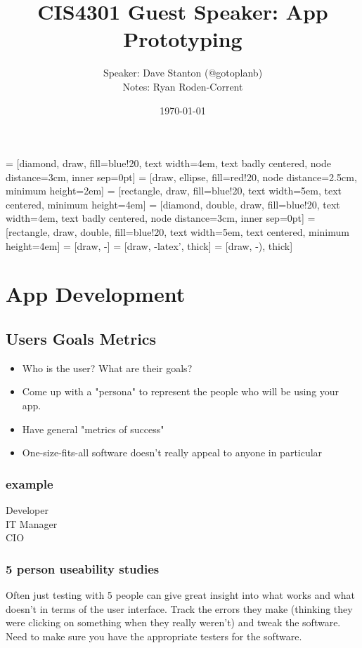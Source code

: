 \documentclass[12pt]{article}
\title{CIS4301 Guest Speaker: App Prototyping}
\author{
  Speaker: Dave Stanton (@gotoplanb)\\
  Notes: Ryan Roden-Corrent
}
\date{\today}
\begin{document}
\setlength\parindent{0pt}
 = [diamond, draw, fill=blue!20, text width=4em,
  text badly centered, node distance=3cm, inner sep=0pt]
 = [draw, ellipse, fill=red!20, node distance=2.5cm,
  minimum height=2em]
 = [rectangle, draw, fill=blue!20, text width=5em,
  text centered, minimum height=4em]
 = [diamond, double, draw, fill=blue!20, text width=4em,
  text badly centered, node distance=3cm, inner sep=0pt]
 = [rectangle, draw, double, fill=blue!20, text width=5em,
  text centered, minimum height=4em]
 = [draw, -]
 = [draw, -latex', thick]
 = [draw, -), thick]
\maketitle

\section{App Development}
\subsection{Users Goals Metrics}
\begin{itemize}
  \item Who is the user? What are their goals?
  \item Come up with a "persona" to represent the people who will
    be using your app.
  \item Have general "metrics of success"
  \item One-size-fits-all software doesn't really appeal to anyone in particular
\end{itemize}

\subsubsection{example}
\begin{description}
  \item[Developer]
  \item[IT Manager]
  \item[CIO]
\end{description}

\subsubsection{5 person useability studies}
Often just testing with 5 people can give great insight into what works and
what doesn't in terms of the user interface. Track the errors they make
(thinking they were clicking on something when they really weren't) and tweak
the software. Need to make sure you have the appropriate testers for the
software.
\end{document}

